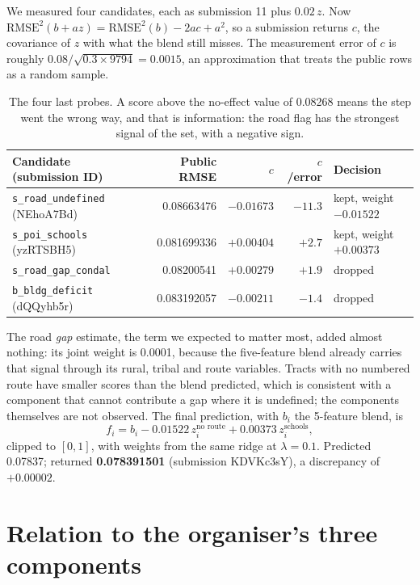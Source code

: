 \documentclass[a4paper]{article}
\newcommand{\R}{\mathrm{RMSE}}
\begin{document}
We measured four candidates, each as submission 11 plus $0.02\,z$. Now
$\R^2(b+az)=\R^2(b)-2ac+a^2$, so a submission returns $c$, the covariance of $z$ with what the blend
still misses. The measurement error of $c$ is roughly $0.08/\sqrt{0.3\times9794}=\num{0.0015}$, an
approximation that treats the public rows as a random sample.

\begin{table}[htbp]
\centering
\small
\caption{The four last probes. A score above the no-effect value of 0.08268 means the step went the wrong
way, and that is information: the road flag has the strongest signal of the set, with a negative sign.}
\label{tab:probes2}
\begin{tabular}{lrrrl}
\toprule
Candidate (submission ID) & Public RMSE & $c$ & $c$/error & Decision \\
\midrule
\texttt{s\_road\_undefined} (NEhoA7Bd) & 0.08663476 & $-0.01673$ & $-11.3$ & kept, weight $-0.01522$ \\
\texttt{s\_poi\_schools} (yzRTSBH5) & 0.081699336 & $+0.00404$ & $+2.7$ & kept, weight $+0.00373$ \\
\texttt{s\_road\_gap\_condal} & 0.08200541 & $+0.00279$ & $+1.9$ & dropped \\
\texttt{b\_bldg\_deficit} (dQQyhb5r) & 0.083192057 & $-0.00211$ & $-1.4$ & dropped \\
\bottomrule
\end{tabular}
\end{table}

The road \emph{gap} estimate, the term we expected to matter most, added almost nothing: its joint weight
is 0.0001, because the five-feature blend already carries that signal through its rural, tribal and route
variables. Tracts with no numbered route have smaller scores than the blend predicted, which is consistent
with a component that cannot contribute a gap where it is undefined; the components themselves are not
observed. The final prediction, with $b_i$ the 5-feature blend, is
\begin{equation}
f_i = b_i - 0.01522\,z_i^{\text{no route}} + 0.00373\,z_i^{\text{schools}},
\end{equation}
clipped to $[0,1]$, with weights from the same ridge at $\lambda=0.1$. Predicted \num{0.07837}; returned
\textbf{\num{0.078391501}} (submission KDVKc3sY), a discrepancy of $+\num{0.00002}$.

\section{Relation to the organiser's three components}
\end{document}
